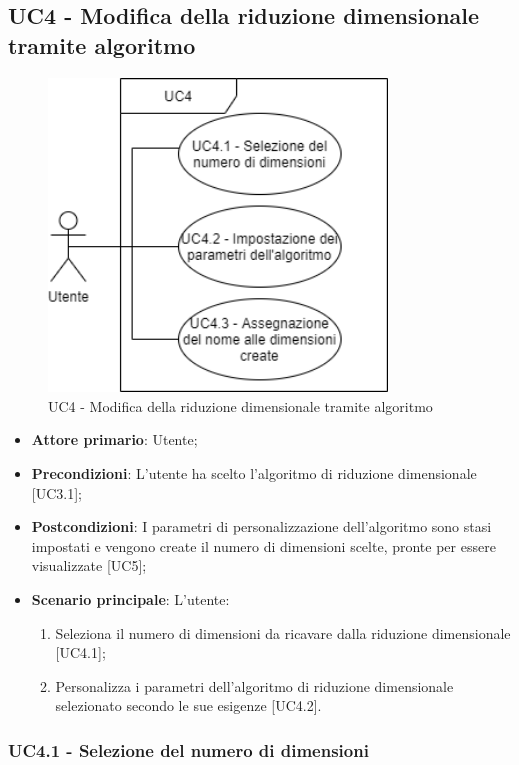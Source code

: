 \subsection{UC4 - Modifica della riduzione dimensionale tramite algoritmo}
\begin{figure}[h]
\includegraphics[width=9cm]{Section/Images/UC4.png}
\centering
\caption{UC4 - Modifica della riduzione dimensionale tramite algoritmo}
\end{figure}
\begin{itemize}
	\item \textbf{Attore primario}: Utente;
	\item \textbf{Precondizioni}: L'utente ha scelto l'algoritmo di riduzione dimensionale [UC3.1];
	\item \textbf{Postcondizioni}: I parametri di personalizzazione dell'algoritmo sono stasi impostati e vengono create il numero di dimensioni scelte, pronte per essere visualizzate [UC5];
	\item \textbf{Scenario principale}: L'utente:
	
	\begin{enumerate}
		\item Seleziona il numero di dimensioni da ricavare dalla riduzione dimensionale [UC4.1];
		\item Personalizza i parametri dell'algoritmo di riduzione dimensionale selezionato secondo le sue esigenze [UC4.2].
	\end{enumerate}		
\end{itemize}

\subsubsection{UC4.1 - Selezione del numero di dimensioni}

